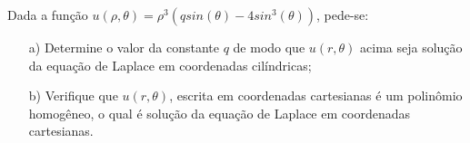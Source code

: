 \linespread{1.5}

Dada a função $u(\rho, \theta) = \rho^3(qsin(\theta) - 4sin^3(\theta))$, pede-se:
\begin{itemize}
    \item[a)] Determine o valor da constante $q$ de modo que $u(r,\theta)$  acima seja solução da equação de Laplace em coordenadas cilíndricas;
    \item[b)] Verifique que $u(r,\theta)$, escrita em coordenadas cartesianas é um polinômio homogêneo, o qual é solução da equação de Laplace em coordenadas cartesianas.
\end{itemize}